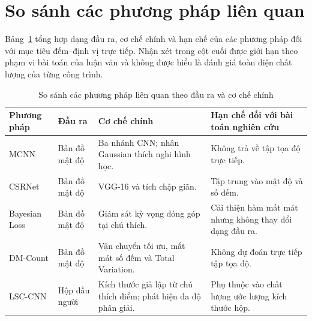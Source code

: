 \section{So sánh các phương pháp liên quan}

Bảng~\ref{tab:related-methods} tổng hợp dạng đầu ra, cơ chế chính và hạn chế của các phương pháp đối với mục tiêu đếm--định vị trực tiếp. Nhận xét trong cột cuối được giới hạn theo phạm vi bài toán của luận văn và không được hiểu là đánh giá toàn diện chất lượng của từng công trình.

\begin{table}[p]
\centering
\caption{So sánh các phương pháp liên quan theo đầu ra và cơ chế chính}
\label{tab:related-methods}
\begingroup
\small\singlespacing
\setlength{\tabcolsep}{3pt}
\renewcommand{\arraystretch}{1.12}
\begin{tabular}{>{\raggedright\arraybackslash}p{2.25cm}>{\raggedright\arraybackslash}p{2.0cm}>{\raggedright\arraybackslash}p{4.0cm}>{\raggedright\arraybackslash}p{4.35cm}}
\toprule
\textbf{Phương pháp} & \textbf{Đầu ra} & \textbf{Cơ chế chính} & \textbf{Hạn chế đối với bài toán nghiên cứu} \\
\midrule
MCNN \cite{zhang2016mcnn} & Bản đồ mật độ & Ba nhánh CNN; nhân Gaussian thích nghi hình học. & Không trả về tập tọa độ trực tiếp. \\
CSRNet \cite{li2018csrnet} & Bản đồ mật độ & VGG-16 và tích chập giãn. & Tập trung vào mật độ và số đếm. \\
Bayesian Loss \cite{ma2019bayesian} & Bản đồ mật độ & Giám sát kỳ vọng đóng góp tại chú thích. & Cải thiện hàm mất mát nhưng không thay đổi dạng đầu ra. \\
DM-Count \cite{wang2020dmcount} & Bản đồ mật độ & Vận chuyển tối ưu, mất mát số đếm và Total Variation. & Không dự đoán trực tiếp tập tọa độ. \\
LSC-CNN \cite{sam2021lsccnn} & Hộp đầu người & Kích thước giả lập từ chú thích điểm; phát hiện đa độ phân giải. & Phụ thuộc vào chất lượng ước lượng kích thước hộp. \\
\bottomrule
\end{tabular}
\endgroup
\end{table}

